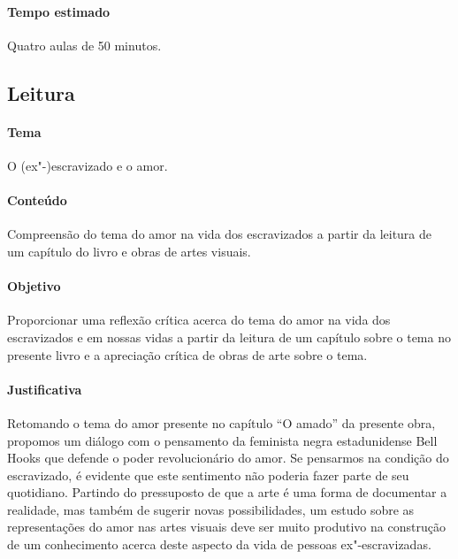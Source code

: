 \documentclass[11pt]{extarticle}
\begin{document}
 \paragraph{Tempo estimado} Quatro aulas de 50 minutos.


\subsection{Leitura}

 \paragraph{Tema} O (ex"-)escravizado e o amor.

 \paragraph{Conteúdo} Compreensão do tema do amor na vida dos escravizados a partir
 da leitura de um capítulo do livro e obras de artes visuais.

 \paragraph{Objetivo} Proporcionar uma reflexão crítica acerca do tema do amor
 na vida dos escravizados e em nossas vidas a partir da leitura de um capítulo sobre
 o tema no presente livro e a apreciação crítica de obras de arte sobre o tema.

 \paragraph{Justificativa} Retomando o tema do amor presente no capítulo
 ``O amado'' da presente obra, propomos um diálogo com o pensamento da feminista negra 
 estadunidense Bell Hooks que defende o poder revolucionário do amor. 
 Se pensarmos na condição do escravizado, é evidente que este
 sentimento não poderia fazer parte de seu quotidiano. 
 Partindo do pressuposto de que a arte é uma forma de documentar a realidade,
 mas também de sugerir novas possibilidades, um estudo sobre as representações
 do amor nas artes visuais deve ser muito produtivo na construção de um conhecimento
 acerca deste aspecto da vida de pessoas ex"-escravizadas.
\end{document}
